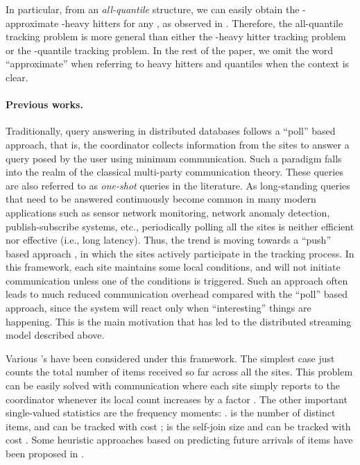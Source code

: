 \documentclass[10pt]{article}
\begin{document}
In particular, from an {\em all-quantile} structure, we can easily obtain
the -approximate -heavy hitters for any , as observed
in \cite{Cormode:Garofalakis:Muthukrishnan:Rastogi:05}.  Therefore, the
all-quantile tracking problem is more general than either the
-heavy hitter tracking problem or the -quantile tracking
problem.  In the rest of the paper, we omit the word ``approximate'' when
referring to heavy hitters and quantiles when the context is clear.

\paragraph{Previous works.}
Traditionally, query answering in distributed databases follows a ``poll''
based approach, that is, the coordinator collects information from the
sites to answer a query posed by the user using minimum communication.
Such a paradigm falls into the realm of the classical multi-party
communication theory.  These queries are also referred to as {\em one-shot}
queries in the literature.  As long-standing queries that need to be
answered continuously become common in many modern applications such as
sensor network monitoring, network anomaly detection, publish-subscribe
systems, etc., periodically polling all the sites is neither efficient nor
effective (i.e., long latency).  Thus, the trend is moving towards a
``push'' based approach \cite{Jain:Hellerstein:Ratnasamy:Wetherall:04}, in
which the sites actively participate in the tracking process.  In this
framework, each site maintains some local conditions, and will not initiate
communication unless one of the conditions is triggered.  Such an approach
often leads to much reduced communication overhead compared with the
``poll'' based approach, since the system will react only when
``interesting'' things are happening.  This is the main motivation that has
led to the distributed streaming model described above.

Various 's have been considered under this framework.  The simplest case
 just counts the total number of items received so far across
all the sites.  This problem can be easily solved with  communication where each site simply reports to the coordinator
whenever its local count increases by a  factor
\cite{keralapura06}.  The other important single-valued statistics are the
frequency moments: .   is the number of
distinct items, and can be tracked with cost  \cite{graham08};  is the self-join size and can
be tracked with cost  \cite{graham08}.  Some heuristic approaches
based on predicting future arrivals of items have been proposed in
\cite{cormode06:what,cormode05:sketch}.
\end{document}
